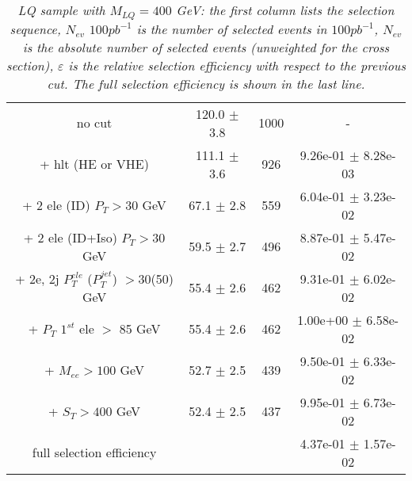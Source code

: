 \documentclass[colclass=cmspaper]{combine}
\begin{document}
\begin{linenumbers}
\begin{table}[htbp]
\begin{center}
\begin{tabular}{|c|c|c|c|}
no cut &120.0 $\pm$ 3.8 & 1000 & - \\
+ hlt (HE or VHE) &111.1 $\pm$ 3.6& 926 & 9.26e-01 $\pm$ 8.28e-03\\
+ 2 ele (ID) $P_{T} >30$ GeV &67.1 $\pm$ 2.8& 559 & 6.04e-01 $\pm$ 3.23e-02\\
+ 2 ele (ID+Iso) $P_{T} >30$ GeV &59.5 $\pm$ 2.7& 496 & 8.87e-01 $\pm$ 5.47e-02\\
+ 2e, 2j $P_{T}^{ele}$ ($P_{T}^{jet}$) $>$30(50) GeV &55.4 $\pm$ 2.6& 462 & 9.31e-01 $\pm$ 6.02e-02\\
+ $P_{T}$ $1^{st}$ ele $>$ 85 GeV &55.4 $\pm$ 2.6& 462 & 1.00e+00 $\pm$ 6.58e-02\\
+ $M_{ee} >100$ GeV&52.7 $\pm$ 2.5& 439 & 9.50e-01 $\pm$ 6.33e-02\\
+ $S_{T} >400$ GeV &52.4 $\pm$ 2.5& 437 & 9.95e-01 $\pm$ 6.73e-02\\
\hline

full selection efficiency& &  & 4.37e-01 $\pm$ 1.57e-02\\
\hline
\end{tabular}
\end{center}
\caption{\small \sl LQ sample with $M_{LQ}=400$ GeV: the first column lists the selection sequence, $N_{ev}$ $100pb^{-1}$ is the number of selected events in $100pb^{-1}$, $N_{ev}$ is the absolute number of selected events (unweighted for the cross section), $\varepsilon$ is the relative selection efficiency with respect to the previous cut. The full selection efficiency is shown in the last line.}
\label{tab:selection_effic_400}
\end{table}




\end{linenumbers}
\end{document}
